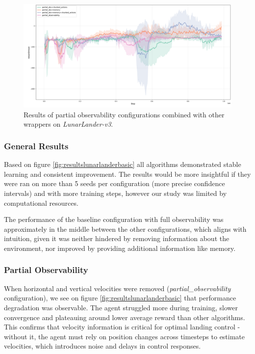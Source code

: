 \documentclass[12pt, a4paper]{article}
\begin{document}
\begin{figure}[H]
	\centering
	\includegraphics[width=1\linewidth]{results_lunar_lander_combined}
	\caption{Results of partial observability configurations combined with other wrappers on \textit{LunarLander-v3}.}
	\label{fig:resultslunarlandercombined}
\end{figure}


\subsubsection{General Results}

Based on figure \ref{fig:resultslunarlanderbasic} all algorithms demonstrated stable learning and consistent improvement. The results would be more insightful if they were ran on more than 5 seeds per configuration (more precise confidence intervals) and with more training steps, however our study was limited by computational resources.

The performance of the baseline configuration with full observability was approximately in the middle between the other configurations, which aligns with intuition, given it was neither hindered by removing information about the environment, nor improved by providing additional information like memory.

\subsubsection{Partial Observability}
When horizontal and vertical velocities were removed (\textit{partial\_observability} configuration), we see on figure \ref{fig:resultslunarlanderbasic} that performance degradation was  observable. The agent struggled more during training, slower convergence and plateauing around lower average reward than other algorithms. This confirms that velocity information is critical for optimal landing control - without it, the agent must rely on position changes across timesteps to estimate velocities, which introduces noise and delays in control responses.
\end{document}
